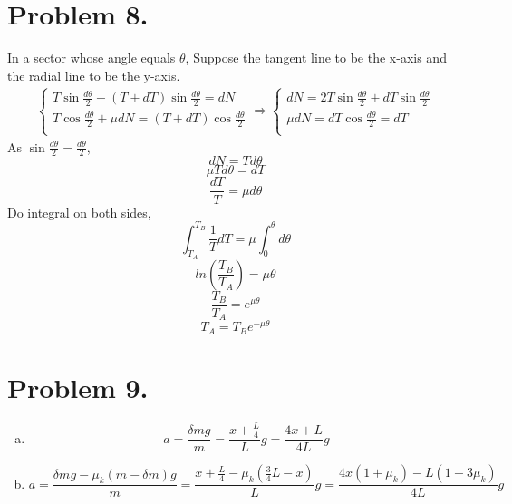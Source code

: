 \documentclass{article}
\begin{document}
\section*{Problem 8.}
	In a sector whose angle equals $\theta$, Suppose the tangent line to be the x-axis and the radial line to be the y-axis.
	\begin{eqnarray*}
		\left\{
		\begin{array}{l}		
			T\sin\frac{d\theta}{2}+(T+dT)\sin\frac{d\theta}{2}=dN\\
			T\cos\frac{d\theta}{2}+\mu dN=(T+dT)\cos\frac{d\theta}{2}\\
		\end{array}
		\right.\Longrightarrow
		\left\{
		\begin{array}{l}
			dN=2T\sin\frac{d\theta}{2}+dT\sin\frac{d\theta}{2}\\
			\mu dN=dT\cos\frac{d\theta}{2}=dT\\
		\end{array}
		\right.
	\end{eqnarray*}
	As $\sin\frac{d\theta}{2}=\frac{d\theta}{2}$,
	$$dN=Td\theta$$
	$$\mu Td\theta=dT$$
	$$\frac{dT}{T}=\mu d\theta$$
	Do integral on both sides,
	$$\int_{T_A}^{T_B}\frac{1}{T}dT=\mu\int_0^\theta d\theta$$
	$$ln\left(\frac{T_B}{T_A}\right)=\mu\theta$$
	$$\frac{T_B}{T_A}=e^{\mu\theta}$$
	$$T_A=T_Be^{-\mu\theta}$$

\section*{Problem 9.}
	\begin{enumerate}[(a)]
	\item
		$$a=\frac{\delta mg}{m}=\frac{x+\frac{L}{4}}{L}g=\frac{4x+L}{4L}g$$
	\item
		$$a=\frac{\delta mg-\mu_k(m-\delta m)g}{m}=\frac{x+\frac{L}{4}-\mu_k(\frac{3}{4}L-x)}{L}g=\frac{4x(1+\mu_k)-L(1+3\mu_k)}{4L}g$$
	
	\end{enumerate}
\end{document}
